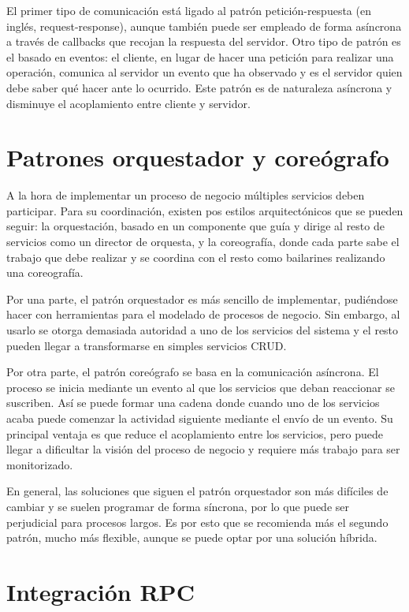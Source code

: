 \documentclass[11pt,a4paper]{article}
\begin{document}
El primer tipo de comunicación está ligado al patrón petición-respuesta (en inglés, request-response), aunque también puede ser empleado de forma asíncrona a través de callbacks que recojan la respuesta del servidor. Otro tipo de patrón es el basado en eventos: el cliente, en lugar de hacer una petición para realizar una operación, comunica al servidor un evento que ha observado y es el servidor quien debe saber qué hacer ante lo ocurrido. Este patrón es de naturaleza asíncrona y disminuye el acoplamiento entre cliente y servidor.

\section{Patrones orquestador y coreógrafo}

A la hora de implementar un proceso de negocio múltiples servicios deben participar. Para su coordinación, existen pos estilos arquitectónicos que se pueden seguir: la orquestación, basado en un componente que guía y dirige al resto de servicios como un director de orquesta, y la coreografía, donde cada parte sabe el trabajo que debe realizar y se coordina con el resto como bailarines realizando una coreografía.

Por una parte, el patrón orquestador es más sencillo de implementar, pudiéndose hacer con herramientas para el modelado de procesos de negocio. Sin embargo, al usarlo se otorga demasiada autoridad a uno de los servicios del sistema y el resto pueden llegar a transformarse en simples servicios CRUD.

Por otra parte, el patrón coreógrafo se basa en la comunicación asíncrona. El proceso se inicia mediante un evento al que los servicios que deban reaccionar se suscriben. Así se puede formar una cadena donde cuando uno de los servicios acaba puede comenzar la actividad siguiente mediante el envío de un evento. Su principal ventaja es que reduce el acoplamiento entre los servicios, pero puede llegar a dificultar la visión del proceso de negocio y requiere más trabajo para ser monitorizado.

En general, las soluciones que siguen el patrón orquestador son más difíciles de cambiar y se suelen programar de forma síncrona, por lo que puede ser perjudicial para procesos largos. Es por esto que se recomienda más el segundo patrón, mucho más flexible, aunque se puede optar por una solución híbrida.

\section{Integración RPC}
\end{document}
